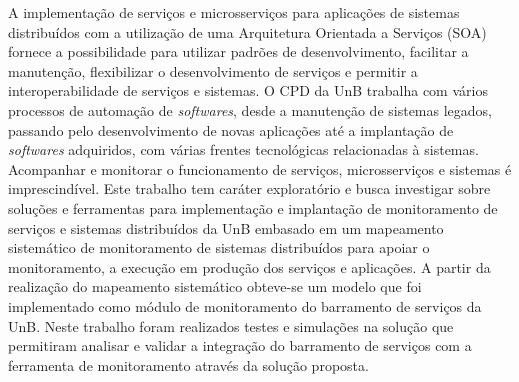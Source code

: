 A implementação de serviços e microsserviços para aplicações de sistemas distribuídos com a utilização de uma Arquitetura Orientada a Serviços (\acrshort{SOA}) fornece a possibilidade para utilizar padrões de desenvolvimento, facilitar a manutenção, flexibilizar o desenvolvimento de serviços e permitir a interoperabilidade de serviços e sistemas. O \acrfull{CPD} da \acrfull{UnB} trabalha com vários processos de automação de \textit{softwares}, desde a manutenção de sistemas legados, passando pelo desenvolvimento de novas aplicações até a implantação de \textit{softwares} adquiridos, com várias frentes tecnológicas relacionadas à sistemas. Acompanhar e monitorar o funcionamento de serviços, microsserviços e sistemas é imprescindível. Este trabalho tem caráter exploratório e busca investigar sobre soluções e ferramentas para implementação e implantação de monitoramento de serviços e sistemas distribuídos da \acrfull{UnB} embasado em um mapeamento sistemático de monitoramento de sistemas distribuídos para apoiar o monitoramento, a execução em produção dos serviços e aplicações. A partir da realização do mapeamento sistemático obteve-se um modelo que foi implementado como módulo de monitoramento do barramento de serviços da \acrfull{UnB}. Neste trabalho foram realizados testes e simulações na solução que permitiram analisar e validar a integração do barramento de serviços com a ferramenta de monitoramento através da solução proposta.